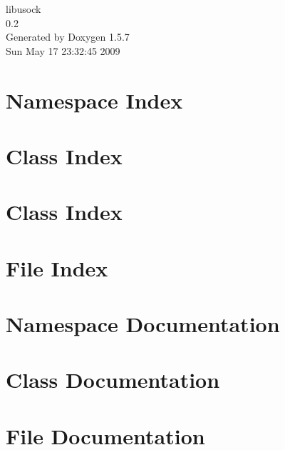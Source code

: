 \documentclass[a4paper]{book}
\begin{document}
\begin{titlepage}
\vspace*{7cm}
\begin{center}
{\Large libusock \\[1ex]\large 0.2 }\\
\vspace*{1cm}
{\large Generated by Doxygen 1.5.7}\\
\vspace*{0.5cm}
{\small Sun May 17 23:32:45 2009}\\
\end{center}
\end{titlepage}
\clearemptydoublepage
{}
\tableofcontents
\clearemptydoublepage
{}
\chapter{Namespace Index}

\chapter{Class Index}

\chapter{Class Index}

\chapter{File Index}

\chapter{Namespace Documentation}

\chapter{Class Documentation}






\chapter{File Documentation}


\printindex
\end{document}
